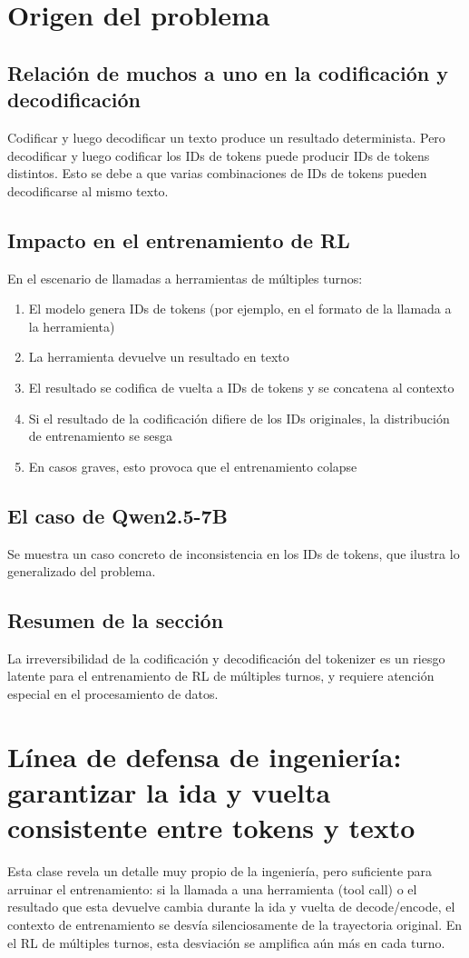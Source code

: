 \documentclass[a4paper]{article}
\begin{document}
\section{Origen del problema}
\subsection{Relación de muchos a uno en la codificación y decodificación}
Codificar y luego decodificar un texto produce un resultado determinista. Pero decodificar y luego codificar los IDs de tokens puede producir IDs de tokens distintos. Esto se debe a que varias combinaciones de IDs de tokens pueden decodificarse al mismo texto.

\subsection{Impacto en el entrenamiento de RL}
En el escenario de llamadas a herramientas de múltiples turnos:
\begin{enumerate}
  \item El modelo genera IDs de tokens (por ejemplo, en el formato de la llamada a la herramienta)
  \item La herramienta devuelve un resultado en texto
  \item El resultado se codifica de vuelta a IDs de tokens y se concatena al contexto
  \item Si el resultado de la codificación difiere de los IDs originales, la distribución de entrenamiento se sesga
  \item En casos graves, esto provoca que el entrenamiento colapse
\end{enumerate}

\subsection{El caso de Qwen2.5-7B}
Se muestra un caso concreto de inconsistencia en los IDs de tokens, que ilustra lo generalizado del problema.

\subsection{Resumen de la sección}
La irreversibilidad de la codificación y decodificación del tokenizer es un riesgo latente para el entrenamiento de RL de múltiples turnos, y requiere atención especial en el procesamiento de datos.

\newpage
\section{Línea de defensa de ingeniería: garantizar la ida y vuelta consistente entre tokens y texto}
Esta clase revela un detalle muy propio de la ingeniería, pero suficiente para arruinar el entrenamiento: si la llamada a una herramienta (tool call) o el resultado que esta devuelve cambia durante la ida y vuelta de decode/encode, el contexto de entrenamiento se desvía silenciosamente de la trayectoria original. En el RL de múltiples turnos, esta desviación se amplifica aún más en cada turno.
\end{document}
